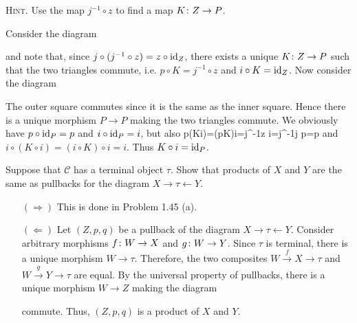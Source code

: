 {\scshape Hint}. Use the map $j^{-1}\circ z$ to find a map $K\colon Z\to P$.
\ep

\bs
Consider the diagram
\bse
{}
\ese
and note that, since $j\circ(j^{-1}\circ z)=z\circ \mathrm{id}_Z$, there exists a unique $K\colon Z\to P$ such that the two triangles commute, i.e. $p\circ K=j^{-1}\circ z$ and $i\circ K=\mathrm{id}_Z$. Now consider the diagram
\bse
{}
\ese
The outer square commutes since it is the same as the inner square. Hence there is a unique morphism $P\to P$ making the two triangles commute. We obviously have $p\circ \mathrm{id}_P=p$ and $i\circ \mathrm{id}_P=i$, but also
\bse
p\circ(K\circ i)=(p\circ K)\circ i=j^{-1}\circ z \circ i=j^{-1}\circ j \circ p=p
\ese
and $i\circ(K\circ i)=(i\circ K)\circ i=i$. Thus $K\circ i=\mathrm{id}_P$.
\es

\bx
Suppose that $\mathcal{C}$ has a terminal object $\tau$. Show that products of $X$ and $Y$ are the same as pullbacks for the diagram $X\to \tau \leftarrow Y$.
\ex

\bs
\begin{itemize}
\item[$(\Rightarrow)$]
This is done in Problem 1.45 (a).
\item[$(\Leftarrow)$]
Let $(Z,p,q)$ be a pullback of the diagram $X\to\tau\leftarrow Y$. Consider arbitrary morphisms $f\colon W\to X$ and $g\colon W\to Y$. Since $\tau$ is terminal, there is a unique morphism $W\to \tau$. Therefore, the two composites $W\xrightarrow{\,f\,}X\to \tau$ and $W\xrightarrow{\,g\,}Y\to \tau$ are equal. By the universal property of pullbacks, there is a unique morphism $W\to Z$ making the diagram 
\bse
{}
\ese
commute. Thus, $(Z,p,q)$ is a product of $X$ and $Y$. 
\end{itemize}
\es

